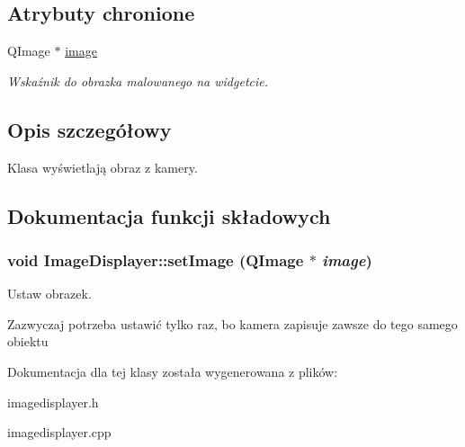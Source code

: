 \subsection*{Atrybuty chronione}
\begin{CompactItemize}
\item 
\hypertarget{class_image_displayer_425fc06c5474754684575cd80e378bd1}{
QImage $\ast$ \hyperlink{class_image_displayer_425fc06c5474754684575cd80e378bd1}{image}}
\label{class_image_displayer_425fc06c5474754684575cd80e378bd1}

\begin{CompactList}\small\item\em Wskaźnik do obrazka malowanego na widgetcie. \item\end{CompactList}\end{CompactItemize}


\subsection{Opis szczegółowy}
Klasa wyświetlają obraz z kamery. 

\subsection{Dokumentacja funkcji składowych}
\hypertarget{class_image_displayer_a801ce426124fdd201a56e44e8b24610}{
\subsubsection[{setImage}]{\setlength{\rightskip}{0pt plus 5cm}void ImageDisplayer::setImage (QImage $\ast$ {\em image})}}
\label{class_image_displayer_a801ce426124fdd201a56e44e8b24610}


Ustaw obrazek. 

Zazwyczaj potrzeba ustawić tylko raz, bo kamera zapisuje zawsze do tego samego obiektu 

Dokumentacja dla tej klasy została wygenerowana z plików:\begin{CompactItemize}
\item 
imagedisplayer.h\item 
imagedisplayer.cpp\end{CompactItemize}
